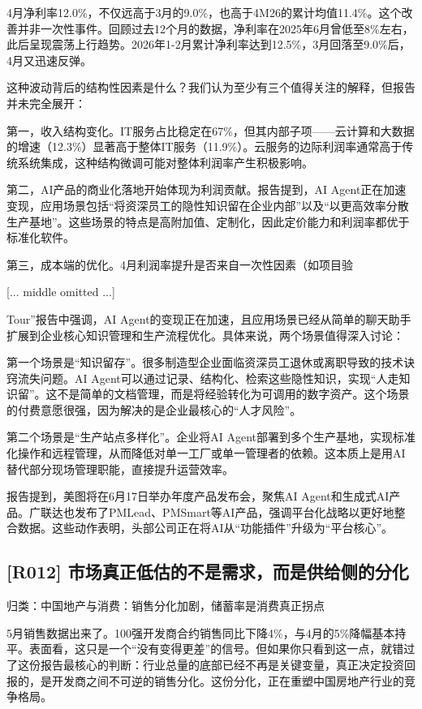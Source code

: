 \documentclass[11pt]{ctexart}
\begin{document}
4月净利率12.0\%，不仅远高于3月的9.0\%，也高于4M26的累计均值11.4\%。这个改善并非一次性事件。回顾过去12个月的数据，净利率在2025年6月曾低至8\%左右，此后呈现震荡上行趋势。2026年1-2月累计净利率达到12.5\%，3月回落至9.0\%后，4月又迅速反弹。

这种波动背后的结构性因素是什么？我们认为至少有三个值得关注的解释，但报告并未完全展开：

第一，收入结构变化。IT服务占比稳定在67\%，但其内部子项——云计算和大数据的增速（12.3\%）显著高于整体IT服务（11.9\%）。云服务的边际利润率通常高于传统系统集成，这种结构微调可能对整体利润率产生积极影响。

第二，AI产品的商业化落地开始体现为利润贡献。报告提到，AI Agent正在加速变现，应用场景包括“将资深员工的隐性知识留在企业内部”以及“以更高效率分散生产基地”。这些场景的特点是高附加值、定制化，因此定价能力和利润率都优于标准化软件。

第三，成本端的优化。4月利润率提升是否来自一次性因素（如项目验

[... middle omitted ...]

 Tour”报告中强调，AI Agent的变现正在加速，且应用场景已经从简单的聊天助手扩展到企业核心知识管理和生产流程优化。具体来说，两个场景值得深入讨论：

第一个场景是“知识留存”。很多制造型企业面临资深员工退休或离职导致的技术诀窍流失问题。AI Agent可以通过记录、结构化、检索这些隐性知识，实现“人走知识留”。这不是简单的文档管理，而是将经验转化为可调用的数字资产。这个场景的付费意愿很强，因为解决的是企业最核心的“人才风险”。

第二个场景是“生产站点多样化”。企业将AI Agent部署到多个生产基地，实现标准化操作和远程管理，从而降低对单一工厂或单一管理者的依赖。这本质上是用AI替代部分现场管理职能，直接提升运营效率。

报告提到，美图将在6月17日举办年度产品发布会，聚焦AI Agent和生成式AI产品。广联达也发布了PMLead、PMSmart等AI产品，强调平台化战略以更好地整合数据。这些动作表明，头部公司正在将AI从“功能插件”升级为“平台核心”。

\subsection{[R012] 市场真正低估的不是需求，而是供给侧的分化}
{\small\color{refgray}归类：中国地产与消费：销售分化加剧，储蓄率是消费真正拐点}

5月销售数据出来了。100强开发商合约销售同比下降4\%，与4月的5\%降幅基本持平。表面看，这只是一个“没有变得更差”的信号。但如果你只看到这一点，就错过了这份报告最核心的判断：行业总量的底部已经不再是关键变量，真正决定投资回报的，是开发商之间不可逆的销售分化。这份分化，正在重塑中国房地产行业的竞争格局。
\end{document}
